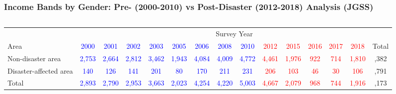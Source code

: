 \documentclass[serif, aspectratio=169]{beamer}
\newcommand{\returnbutton}[2]{%
  \vspace{-1.0cm}  %
  \hfill  %
  \hyperlink{#1}{%
    {\footnotesize\beamerbutton{#2}}%
  }%
  \vspace{0.3cm}  %
}
\begin{document}
\begin{frame}[label=income_band]
\frametitle{Income Bands by Gender: Pre- (2000-2010) vs Post-Disaster (2012-2018) Analysis (JGSS)}
\vspace{-0.4cm}
\returnbutton{income_band_main}{Return}
    \vspace{0.01cm}
    \begin{columns}[T]
        \begin{column}{0.7\textwidth}
            \raggedright
            \begin{table}
                \tiny
                \setlength{\tabcolsep}{1.2pt}
                \renewcommand{\arraystretch}{0.8}
                \begin{tabular}{lcccccccccccccc}
                    \toprule
                    & \multicolumn{14}{c}{Survey Year} \\
                    \cmidrule(lr){2-15}
                    Area & \quad \textcolor{blue}{2000} & \textcolor{blue}{2001} & \textcolor{blue}{2002} & \textcolor{blue}{2003} & \textcolor{blue}{2005} & \textcolor{blue}{2006} & \textcolor{blue}{2008} & \textcolor{blue}{2010} & \textcolor{red}{2012} & \textcolor{red}{2015} & \textcolor{red}{2016} & \textcolor{red}{2017} & \textcolor{red}{2018} & \quad Total\\
                    \midrule
                    Non-disaster area & \quad \textcolor{blue}{2,753} & \textcolor{blue}{2,664} & \textcolor{blue}{2,812} & \textcolor{blue}{3,462} & \textcolor{blue}{1,943} & \textcolor{blue}{4,084} & \textcolor{blue}{4,009} & \textcolor{blue}{4,772} & \textcolor{red}{4,461} & \textcolor{red}{1,976} & \textcolor{red}{922} & \textcolor{red}{714} & \textcolor{red}{1,810} & \quad 36,382 \\
                    Disaster-affected area & \quad \textcolor{blue}{140} & \textcolor{blue}{126} & \textcolor{blue}{141} & \textcolor{blue}{201} & \textcolor{blue}{80} & \textcolor{blue}{170} & \textcolor{blue}{211} & \textcolor{blue}{231} & \textcolor{red}{206} & \textcolor{red}{103} & \textcolor{red}{46} & \textcolor{red}{30} & \textcolor{red}{106} & \quad 1,791 \\
                    \midrule
                    Total & \quad \textcolor{blue}{2,893} & \textcolor{blue}{2,790} & \textcolor{blue}{2,953} & \textcolor{blue}{3,663} & \textcolor{blue}{2,023} & \textcolor{blue}{4,254} & \textcolor{blue}{4,220} & \textcolor{blue}{5,003} & \textcolor{red}{4,667} & \textcolor{red}{2,079} & \textcolor{red}{968} & \textcolor{red}{744} & \textcolor{red}{1,916} & \quad 38,173 \\

\end{tabular}
\end{table}
\end{column}
\end{columns}
\end{frame}
\end{document}
